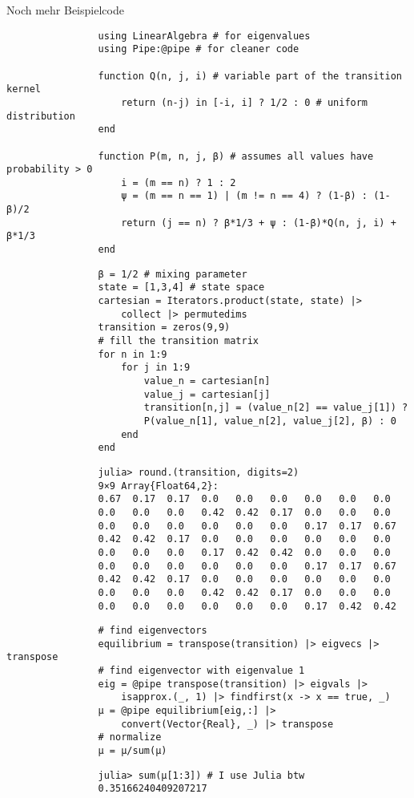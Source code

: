 \documentclass[11pt, ngerman, hyperref={unicode}]{beamer}
\theoremstyle{definition} %
\begin{document}
	\begin{frame}[fragile]{Noch mehr Beispielcode}
			
			\begin{overprint}
				\begin{verbatim}
				using LinearAlgebra # for eigenvalues
				using Pipe:@pipe # for cleaner code
				
				function Q(n, j, i) # variable part of the transition kernel
					return (n-j) in [-i, i] ? 1/2 : 0 # uniform distribution
				end
				
				function P(m, n, j, β) # assumes all values have probability > 0
					i = (m == n) ? 1 : 2
					ψ = (m == n == 1) | (m != n == 4) ? (1-β) : (1-β)/2
					return (j == n) ? β*1/3 + ψ : (1-β)*Q(n, j, i) + β*1/3
				end
				\end{verbatim}
				\begin{verbatim}
				β = 1/2 # mixing parameter
				state = [1,3,4] # state space
				cartesian = Iterators.product(state, state) |>
					collect |> permutedims
				transition = zeros(9,9)
				# fill the transition matrix
				for n in 1:9
					for j in 1:9
						value_n = cartesian[n]
						value_j = cartesian[j]
						transition[n,j] = (value_n[2] == value_j[1]) ? 
						P(value_n[1], value_n[2], value_j[2], β) : 0
					end
				end
				\end{verbatim}
				\begin{verbatim}
				julia> round.(transition, digits=2)
				9×9 Array{Float64,2}:
				0.67  0.17  0.17  0.0   0.0   0.0   0.0   0.0   0.0
				0.0   0.0   0.0   0.42  0.42  0.17  0.0   0.0   0.0
				0.0   0.0   0.0   0.0   0.0   0.0   0.17  0.17  0.67
				0.42  0.42  0.17  0.0   0.0   0.0   0.0   0.0   0.0
				0.0   0.0   0.0   0.17  0.42  0.42  0.0   0.0   0.0
				0.0   0.0   0.0   0.0   0.0   0.0   0.17  0.17  0.67
				0.42  0.42  0.17  0.0   0.0   0.0   0.0   0.0   0.0
				0.0   0.0   0.0   0.42  0.42  0.17  0.0   0.0   0.0
				0.0   0.0   0.0   0.0   0.0   0.0   0.17  0.42  0.42
				\end{verbatim}
				\begin{verbatim}
				# find eigenvectors
				equilibrium = transpose(transition) |> eigvecs |> transpose
				# find eigenvector with eigenvalue 1
				eig = @pipe transpose(transition) |> eigvals |> 
					isapprox.(_, 1) |> findfirst(x -> x == true, _)
				μ = @pipe equilibrium[eig,:] |> 
					convert(Vector{Real}, _) |> transpose
				# normalize
				μ = μ/sum(μ)
				\end{verbatim}
				\begin{verbatim}
				julia> sum(μ[1:3]) # I use Julia btw
				0.35166240409207217
				\end{verbatim}
			\end{overprint}
	\end{frame}
\end{document}
